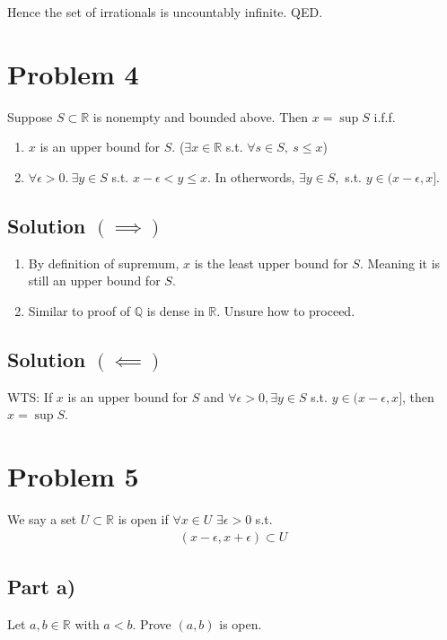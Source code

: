 \documentclass[12pt,fleqn]{article}
\numberwithin{equation}{section} %
\begin{document}
Hence the set of irrationals is uncountably infinite. QED.

\section*{Problem 4}
Suppose $S \subset \mathbb R$ is nonempty and bounded above. Then $x = \sup S$ i.f.f. 
\begin{enumerate}
	\item $x$ is an upper bound for $S$. ($\exists x \in \mathbb R$ s.t. $ \forall s \in S, ~ s\leq x$)
	\item $\forall \epsilon > 0. ~  \exists y \in S$ s.t. $x - \epsilon < y \leq x$. In otherwords,  $\exists y \in S,$ s.t. $y \in (x-\epsilon , x]$.
\end{enumerate}

\subsection*{Solution $(\implies)$}
\begin{enumerate}
	\item By definition of supremum, $x$ is the least upper bound for $S$. Meaning it is still an upper bound for $S$.
	\item Similar to proof of $\mathbb Q$ is dense in $\mathbb R$. Unsure how to proceed.
\end{enumerate}
\subsection*{Solution $(\impliedby)$}
WTS: If $x$ is an upper bound for $S$ and $\forall \epsilon > 0,\exists y \in S$ s.t. $y \in (x-\epsilon, x]$, then $x = \sup S$. \\






\section*{Problem 5}
We say a set $U \subset \mathbb R$ is open if $\forall x \in U$ $\exists \epsilon >0$ s.t.
\begin{align}
	(x - \epsilon, x + \epsilon) \subset U
\end{align}
\subsection*{Part a)}
Let $a,b \in \mathbb R$ with $a<b$. Prove $(a,b)$ is open.\\
\end{document}
